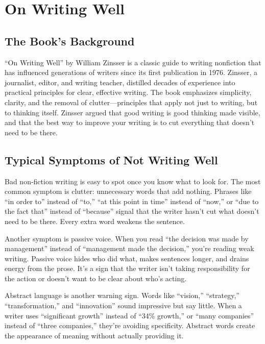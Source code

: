 \chapter{On Writing Well}

\section{The Book's Background}

``On Writing Well'' by William Zinsser is a classic guide to writing nonfiction that has influenced generations of writers since its first publication in 1976. Zinsser, a journalist, editor, and writing teacher, distilled decades of experience into practical principles for clear, effective writing. The book emphasizes simplicity, clarity, and the removal of clutter—principles that apply not just to writing, but to thinking itself. Zinsser argued that good writing is good thinking made visible, and that the best way to improve your writing is to cut everything that doesn't need to be there.

\nocite{zinsser:2006-on-writing-well}

\section{Typical Symptoms of Not Writing Well}

Bad non-fiction writing is easy to spot once you know what to look for. The most common symptom is clutter: unnecessary words that add nothing. Phrases like ``in order to'' instead of ``to,'' ``at this point in time'' instead of ``now,'' or ``due to the fact that'' instead of ``because'' signal that the writer hasn't cut what doesn't need to be there. Every extra word weakens the sentence.

Another symptom is passive voice. When you read ``the decision was made by management'' instead of ``management made the decision,'' you're reading weak writing. Passive voice hides who did what, makes sentences longer, and drains energy from the prose. It's a sign that the writer isn't taking responsibility for the action or doesn't want to be clear about who's acting.

Abstract language is another warning sign. Words like ``vision,'' ``strategy,'' ``transformation,'' and ``innovation'' sound impressive but say little. When a writer uses ``significant growth'' instead of ``34\% growth,'' or ``many companies'' instead of ``three companies,'' they're avoiding specificity. Abstract words create the appearance of meaning without actually providing it.

